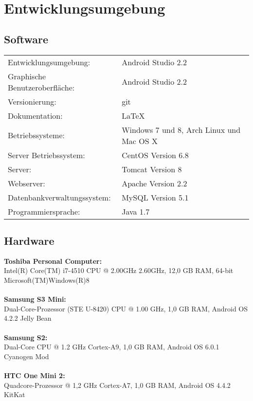 \section{Entwicklungsumgebung}

\subsection{Software}
\begin{tabular}{ll}
Entwicklungsumgebung: 			&	Android Studio 2.2\\
Graphische Benutzeroberfläche: 	&	Android Studio 2.2\\
Versionierung: 					&	git\\
Dokumentation:					&	\LaTeX \\
Betriebssysteme: 				&	Windows 7 und 8, Arch Linux und Mac OS X\\
Server Betriebssystem:			&	CentOS Version 6.8\\
Server:							&	Tomcat Version 8\\
Webserver:						&	Apache Version 2.2\\
Datenbankverwaltungssystem: 	&	MySQL Version 5.1\\
Programmiersprache:				&	Java 1.7\\
\end{tabular}

\subsection{Hardware}

\textbf{Toshiba Personal Computer:}\\	
Intel(R) Core(TM) i7-4510 CPU @ 2.00GHz 2.60GHz,
12,0 GB RAM,
64-bit Microsoft(TM)Windows(R)8\\
\\
\textbf{Samsung S3 Mini:} \\		
Dual-Core-Prozessor (STE U-8420) CPU @ 1.00 GHz,
1,0 GB RAM,
Android OS 4.2.2 Jelly Bean\\
\\
\textbf{Samsung S2:} \\                       
Dual-Core CPU @ 1.2 GHz Cortex-A9,
1,0 GB RAM,
Android OS 6.0.1 Cyanogen Mod\\
\\                                  
\textbf{HTC One Mini 2:}\\						
Quadcore-Prozessor @ 1,2 GHz Cortex-A7,
1,0 GB RAM,
Android OS 4.4.2 KitKat\\                                  
